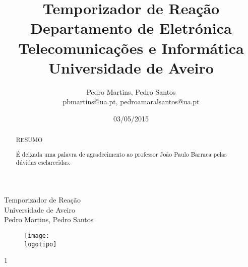 \documentclass[a4paper,11pt,onecolumn]{report}
\begin{document}
%
\def\titulo{Temporizador de Reação}
\def\data{03/05/2015}
\def\autores{Pedro Martins, Pedro Santos}
\def\autorescontactos{pbmartins@ua.pt, pedroamaralsantos@ua.pt}
\def\versao{1}
\def\departamento{Departamento de Eletrónica Telecomunicações e Informática}
\def\empresa{Universidade de Aveiro}
\def\logotipo{ua.pdf}
%
%
\begin{titlepage}

\begin{center}
%
\vspace*{50mm}
%
{\Huge \titulo}\\ 
%
\vspace{10mm}
%
{\Large \empresa}\\
%
\vspace{10mm}
%
{\LARGE \autores}\\ 
%
%
\vspace{30mm}
%
\begin{figure}[h]
\center
\texttt{[image: \\logotipo]}
\end{figure}
%
\vspace{30mm}
\end{center}
%
\begin{flushright}
\versao
\end{flushright}
\end{titlepage}

%
%
%
%
\title{%
{\Huge\textbf{\titulo}}\\
{\Large \departamento\\ \empresa}
}
%
\author{%
    \autores \\
    \autorescontactos
}
%
\date{\data}
%
\maketitle

%
%

\begin{abstract}
RESUMO
 
\end{abstract}

\renewcommand{\abstractname}{Agradecimentos}
\begin{abstract}
É deixada uma palavra de agradecimento ao professor João Paulo Barraca pelas dúvidas esclarecidas.
\end{abstract}


\tableofcontents
\listoftables


\clearpage
{}
\end{document}
